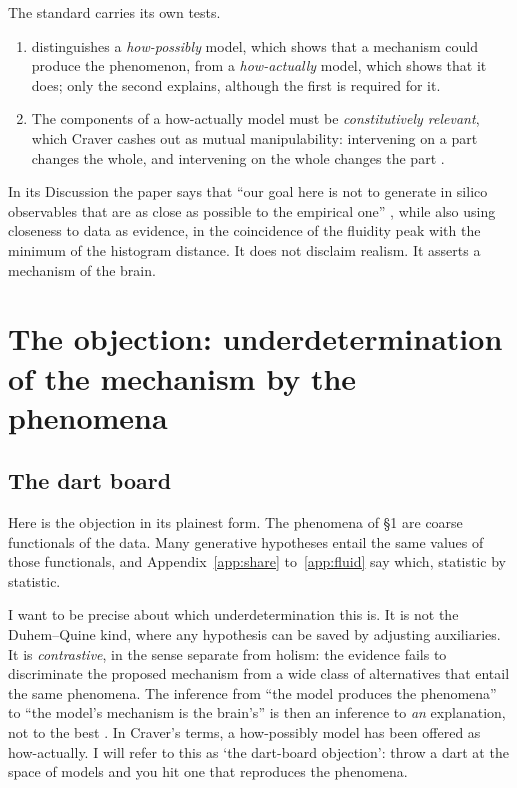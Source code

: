 \documentclass[11pt]{article}
\begin{document}
The standard carries its own tests.
\begin{enumerate}
\item \textcite{craver2006} distinguishes a \emph{how-possibly} model, which shows that a mechanism could produce the phenomenon, from a \emph{how-actually} model, which shows that it does; only the second explains, although the first is required for it.
\item The components of a how-actually model must be \emph{constitutively relevant}, which Craver cashes out as mutual manipulability: intervening on a part changes the whole, and intervening on the whole changes the part \parencite{craver2007}.
\end{enumerate}
In its Discussion the paper says that ``our goal here is not to generate in silico observables that are as close as possible to the empirical one'' \parencite[Discussion]{fousek2024}, while also using closeness to data as evidence, in the coincidence of the fluidity peak with the minimum of the histogram distance. It does not disclaim realism. It asserts a mechanism of the brain.

\section{The objection: underdetermination of the mechanism by the phenomena}
\subsection{The dart board}
Here is the objection in its plainest form. The phenomena of \S1 are coarse functionals of the data. Many generative hypotheses entail the same values of those functionals, and Appendix~\ref{app:share} to~\ref{app:fluid} say which, statistic by statistic.

I want to be precise about which underdetermination this is. It is not the Duhem--Quine kind, where any hypothesis can be saved by adjusting auxiliaries. It is \emph{contrastive}, in the sense \textcite{laudan1991} separate from holism: the evidence fails to discriminate the proposed mechanism from a wide class of alternatives that entail the same phenomena. The inference from ``the model produces the phenomena'' to ``the model's mechanism is the brain's'' is then an inference to \emph{an} explanation, not to the best \parencite{lipton2004}. In Craver's terms, a how-possibly model has been offered as how-actually. I will refer to this as `the dart-board objection': throw a dart at the space of models and you hit one that reproduces the phenomena.
\end{document}
